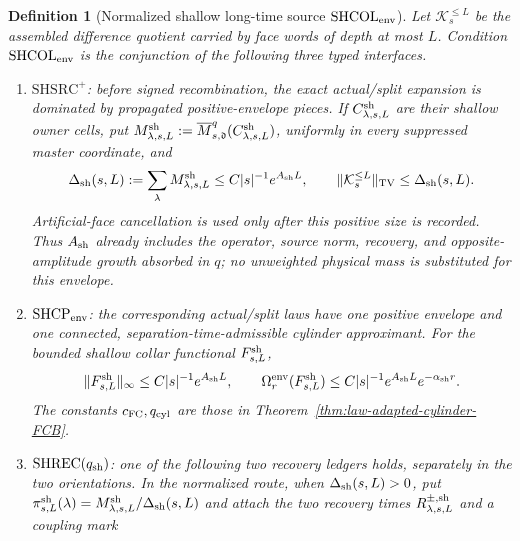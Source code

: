 \documentclass[11pt]{article}
\newtheorem{definition}[theorem]{Definition}
\begin{document}
\begin{definition}[Normalized shallow long-time source
$\mathrm{SHCOL}_{\rm env}$]
\label{def:shallow-collar-envelope}
Let $\mathcal K_s^{\le L}$ be the assembled difference quotient carried by
face words of depth at most $L$.  Condition
$\mathrm{SHCOL}_{\rm env}$ is the conjunction of the following three typed
interfaces.
\begin{enumerate}[label=\textup{(SH\arabic*)}]
\item $\mathrm{SHSRC}^{+}$: before signed recombination, the exact
      actual/split expansion is dominated by propagated positive-envelope
      pieces.  If $C^{\rm sh}_{\lambda,s,L}$ are their shallow owner cells,
      put
      $M^{\rm sh}_{\lambda,s,L}:=
      \overline M_{s,\mathfrak d}^{q}
      (C^{\rm sh}_{\lambda,s,L})$, uniformly in every suppressed master
      coordinate, and
      \begin{equation}
      \label{eq:shallow-positive-source-mass}
       \Delta_{\rm sh}(s,L):=\sum_\lambda
       M^{\rm sh}_{\lambda,s,L}
       \le C|s|^{-1}e^{A_{\rm sh}L},\qquad
       \|\mathcal K_s^{\le L}\|_{\rm TV}\le\Delta_{\rm sh}(s,L).
      \end{equation}
      Artificial-face cancellation is used only after this positive size is
      recorded.  Thus $A_{\rm sh}$ already includes the operator, source
      norm, recovery, and opposite-amplitude growth absorbed in $q$; no
      unweighted physical mass is substituted for this envelope.
\item $\mathrm{SHCP}_{\rm env}$: the corresponding actual/split laws have
      one positive envelope and one connected, separation-time-admissible
      cylinder approximant.  For the bounded shallow collar functional
      $F^{\rm sh}_{s,L}$,
\begin{equation}
\label{eq:shallow-collar-envelope}
 \|F^{\rm sh}_{s,L}\|_\infty
 \le C|s|^{-1}e^{A_{\rm sh}L},\qquad
 \Omega_r^{\rm env}(F^{\rm sh}_{s,L})
 \le C|s|^{-1}e^{A_{\rm sh}L}e^{-\alpha_{\rm sh}r}.
\end{equation}
      The constants $c_{\rm FC},q_{\rm cyl}$ are those in
      Theorem~\ref{thm:law-adapted-cylinder-FCB}.
\item $\mathrm{SHREC}(q_{\rm sh})$: one of the following two recovery
      ledgers holds, separately in the two orientations.  In the normalized
      route, when $\Delta_{\rm sh}(s,L)>0$, put
      $\pi^{\rm sh}_{s,L}(\lambda)=
      M^{\rm sh}_{\lambda,s,L}/\Delta_{\rm sh}(s,L)$ and attach the two
      recovery times $R^{\pm,\rm sh}_{\lambda,s,L}$ and a coupling mark

\end{enumerate}
\end{definition}
\end{document}
